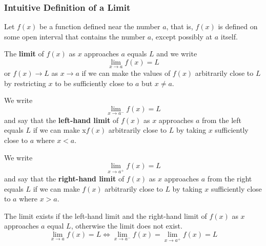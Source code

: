 \subsubsection*{Intuitive Definition of a Limit}
Let \(f(x)\) be a function defined near the number \(a\), that is, \(f(x)\) is
defined on some open interval that contains the number \(a\),
except possibly at \(a\) itself.
\begin{definition}
    The \textbf{limit} of \(f(x)\) as \(x\) approaches \(a\) equals \(L\) and
    we write
    \[\lim_{x\to a}f(x)=L\]
    or \(f(x)\to L\) as \(x\to a\)
    if we can make the values of \(f(x)\) arbitrarily close to \(L\) by
    restricting \(x\) to be sufficiently close to \(a\) but \(x\neq a\).
\end{definition}
\begin{definition}
    We write
    \[\lim_{x\to a^-}f(x)=L\]
    and say that the \textbf{left-hand limit} of \(f(x)\) as \(x\) approaches
    \(a\) from the left equals \(L\) if we can make x\(f(x)\) arbitrarily
    close to \(L\) by taking \(x\) sufficiently close to \(a\) where \(x<a\).
\end{definition}
\begin{definition}
    We write
    \[\lim_{x\to a^+}f(x)=L\]
    and say that the \textbf{right-hand limit} of \(f(x)\) as \(x\) approaches
    \(a\) from the right equals \(L\) if we can make \(f(x)\) arbitrarily
    close to \(L\) by taking \(x\) sufficiently close to \(a\) where \(x>a\).
\end{definition}
The limit exists if the left-hand limit and the right-hand limit of \(f(x)\)
as \(x\) approaches \(a\) equal \(L\), otherwise the limit does not exist.
\[\lim_{x\to a}f(x)=L\iff\lim_{x\to a^-}f(x)=\lim_{x\to a^+}f(x)=L\]


